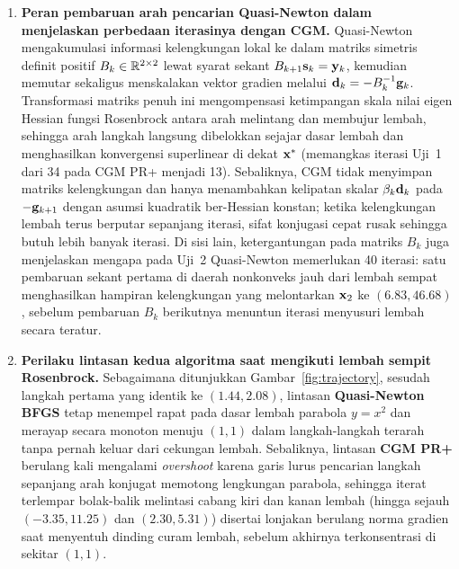 \documentclass[12pt,a4paper]{article}
\begin{document}
\begin{enumerate}
  \item \textbf{Peran pembaruan arah pencarian Quasi-Newton dalam menjelaskan perbedaan iterasinya dengan CGM.}
  Quasi-Newton mengakumulasi informasi kelengkungan lokal ke dalam matriks simetris definit positif $B_k\in\mathbb{R}^{2\times2}$
  lewat syarat sekant $B_{k+1}\mathbf{s}_k=\mathbf{y}_k$, kemudian memutar sekaligus menskalakan vektor gradien melalui
  $\mathbf{d}_k=-B_k^{-1}\mathbf{g}_k$. Transformasi matriks penuh ini mengompensasi ketimpangan skala nilai eigen Hessian fungsi
  Rosenbrock antara arah melintang dan membujur lembah, sehingga arah langkah langsung dibelokkan sejajar dasar lembah
  dan menghasilkan konvergensi superlinear di dekat $\mathbf{x}^*$ (memangkas iterasi Uji~1 dari 34 pada CGM PR+ menjadi 13).
  Sebaliknya, CGM tidak menyimpan matriks kelengkungan dan hanya menambahkan kelipatan skalar $\beta_k\mathbf{d}_k$ pada
  $-\mathbf{g}_{k+1}$ dengan asumsi kuadratik ber-Hessian konstan; ketika kelengkungan lembah terus berputar sepanjang iterasi,
  sifat konjugasi cepat rusak sehingga butuh lebih banyak iterasi. Di sisi lain, ketergantungan pada matriks $B_k$ juga
  menjelaskan mengapa pada Uji~2 Quasi-Newton memerlukan 40 iterasi: satu pembaruan sekant pertama di daerah nonkonveks
  jauh dari lembah sempat menghasilkan hampiran kelengkungan yang melontarkan $\mathbf{x}_2$ ke $(6.83,46.68)$, sebelum
  pembaruan $B_k$ berikutnya menuntun iterasi menyusuri lembah secara teratur.

  \item \textbf{Perilaku lintasan kedua algoritma saat mengikuti lembah sempit Rosenbrock.}
  Sebagaimana ditunjukkan Gambar~\ref{fig:trajectory}, sesudah langkah pertama yang identik ke $(1.44,2.08)$, lintasan
  \textbf{Quasi-Newton BFGS} tetap menempel rapat pada dasar lembah parabola $y=x^2$ dan merayap secara monoton menuju
  $(1,1)$ dalam langkah-langkah terarah tanpa pernah keluar dari cekungan lembah. Sebaliknya, lintasan \textbf{CGM PR+}
  berulang kali mengalami \emph{overshoot} karena garis lurus pencarian langkah sepanjang arah konjugat memotong
  lengkungan parabola, sehingga iterat terlempar bolak-balik melintasi cabang kiri dan kanan lembah (hingga sejauh
  $(-3.35,11.25)$ dan $(2.30,5.31)$) disertai lonjakan berulang norma gradien saat menyentuh dinding curam lembah,
  sebelum akhirnya terkonsentrasi di sekitar $(1,1)$.
\end{enumerate}
\end{document}
